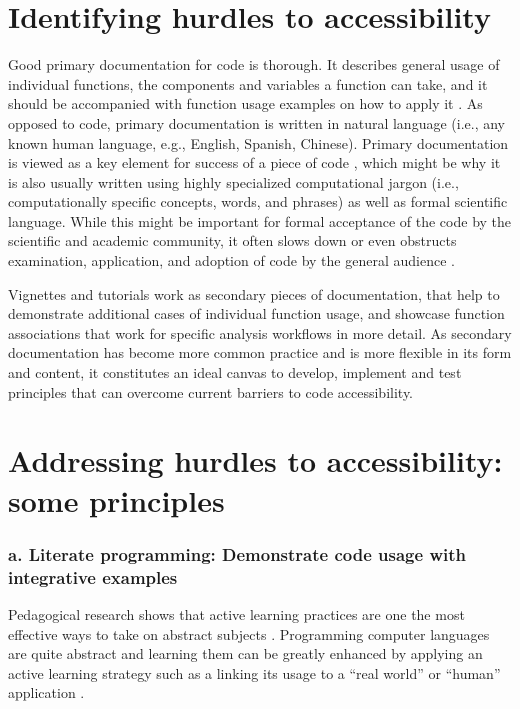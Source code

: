 \documentclass[12pt]{article}
\begin{document}
\section*{Identifying hurdles to accessibility}
\label{sec:identifying}

Good primary documentation for code is thorough. It describes general usage of individual functions,
the components and variables a function can take, and it should be accompanied with
function usage examples on how to apply it \citep{karimzadeh2018top}.
As opposed to code, primary documentation is written in natural language (i.e.,
any known human language, e.g., English, Spanish, Chinese).
Primary documentation is viewed as a key element for success of a piece of code
\citep{karimzadeh2018top},
which might be why it is also usually written using highly specialized computational jargon (i.e., computationally specific concepts,
words, and phrases) as well as formal scientific language.
While this might be important for formal acceptance of the code by the scientific
and academic community, it often slows down or even
obstructs examination, application, and adoption of code by the general audience \citep{ball2017its}.

Vignettes and tutorials work as secondary pieces of documentation, that help to demonstrate
additional cases of individual function usage, and showcase function associations
that work for specific analysis workflows in more detail.
As secondary documentation has become more common practice and is more flexible
in its form and content, it constitutes an ideal canvas to develop, implement and
test principles that can overcome current barriers to code accessibility.

\section*{Addressing hurdles to accessibility: some principles}
\label{sec:addressing}

\subsubsection*{a. Literate programming: Demonstrate code usage with integrative examples}

Pedagogical research shows that active learning practices are one the most effective
ways to take on abstract subjects \citep{freeman2014active}.
Programming computer languages are quite abstract and learning them can be greatly
enhanced by applying an active learning strategy such as a linking its usage to
a ``real world'' or ``human'' application \citep{felder2009active}.
\end{document}
